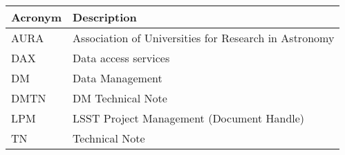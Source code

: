 \addtocounter{table}{-1}
\begin{longtable}{|l|p{}|}\hline
\textbf{Acronym} & \textbf{Description}  \\\hline

AURA & Association of Universities for Research in Astronomy \\\hline
DAX & Data access services \\\hline
DM & Data Management \\\hline
DMTN & DM Technical Note \\\hline
LPM & LSST Project Management (Document Handle) \\\hline
TN & Technical Note \\\hline
\end{longtable}
